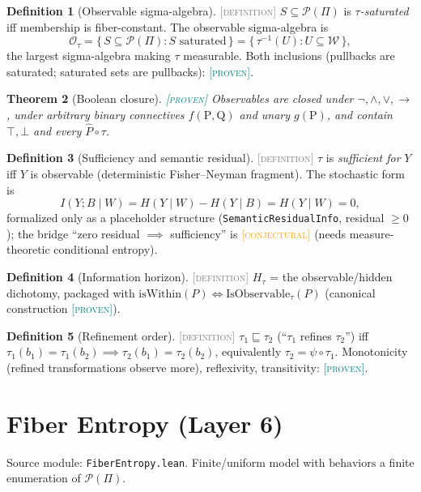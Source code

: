 \documentclass[11pt]{article}
\newcommand{\PROVEN}{\textcolor{teal}{\textsc{[proven]}}}
\newcommand{\DEFINITION}{\textcolor{gray}{\textsc{[definition]}}}
\newcommand{\CONJECTURAL}{\textcolor{orange}{\textsc{[conjectural]}}}
\newcommand{\PT}{\Pi}                          %
\newcommand{\PS}{\mathcal{P}(\PT)}             %
\newcommand{\WS}{\mathcal{W}}                  %
\newcommand{\tmap}{\tau}                       %
\theoremstyle{plain}
\newtheorem{theorem}{Theorem}[section]
\theoremstyle{definition}
\newtheorem{definition}[theorem]{Definition}
\begin{document}
\begin{definition}[Observable sigma-algebra]\DEFINITION\;
$S \subseteq \PS$ is \emph{$\tmap$-saturated} iff membership is
fiber-constant. The observable sigma-algebra is
\[
  \mathcal{O}_\tmap
  = \{\, S \subseteq \PS : S \text{ saturated} \,\}
  = \{\, \tmap^{-1}(U) : U \subseteq \WS \,\},
\]
the largest sigma-algebra making $\tmap$ measurable. Both inclusions
(pullbacks are saturated; saturated sets are pullbacks): \PROVEN.
\end{definition}

\begin{theorem}[Boolean closure]\PROVEN\;
Observables are closed under $\neg, \wedge, \vee, \to$, under arbitrary
binary connectives $f(\mathrm{P},\mathrm{Q})$ and unary $g(\mathrm{P})$, and
contain $\top, \bot$ and every $\hat{P} \circ \tmap$.
\end{theorem}

\begin{definition}[Sufficiency and semantic residual]\DEFINITION\;
$\tmap$ is \emph{sufficient for} $Y$ iff $Y$ is observable (deterministic
Fisher--Neyman fragment). The stochastic form is
\[
  I(Y ; B \mid W) = H(Y \mid W) - H(Y \mid B) = H(Y \mid W) = 0,
\]
formalized only as a placeholder structure
(\texttt{SemanticResidualInfo}, residual $\ge 0$); the bridge
``zero residual $\implies$ sufficiency'' is \CONJECTURAL{} (needs
measure-theoretic conditional entropy).
\end{definition}

\begin{definition}[Information horizon]\DEFINITION\;
$H_\tmap$ = the observable/hidden dichotomy, packaged with
$\mathrm{isWithin}(P) \iff \mathrm{IsObservable}_\tmap(P)$ (canonical
construction \PROVEN).
\end{definition}

\begin{definition}[Refinement order]\DEFINITION\;
$\tmap_1 \sqsubseteq \tmap_2$ (``$\tmap_1$ refines $\tmap_2$'') iff
$\tmap_1(b_1) = \tmap_1(b_2) \implies \tmap_2(b_1) = \tmap_2(b_2)$,
equivalently $\tmap_2 = \psi \circ \tmap_1$. Monotonicity (refined
transformations observe more), reflexivity, transitivity: \PROVEN.
\end{definition}

\section{Fiber Entropy (Layer 6)}
\label{sec:fiberentropy}
Source module: \texttt{FiberEntropy.lean}. Finite/uniform model with
$\mathrm{behaviors}$ a finite enumeration of $\PS$.
\end{document}
